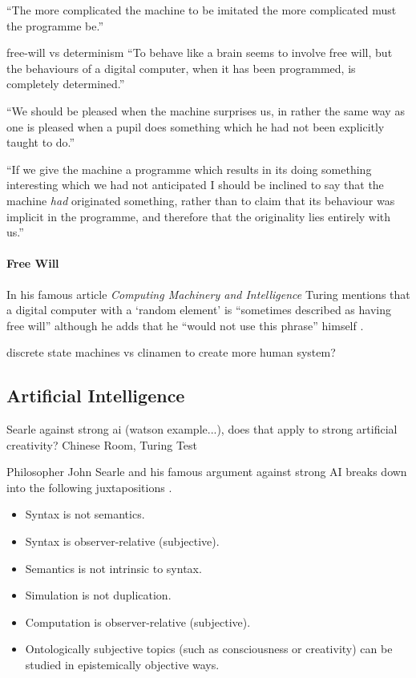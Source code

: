 \documentclass[11pt]{thesis} %
\begin{document}
``The more complicated the machine to be imitated the more complicated must the programme be.''\autocite{Turing1951} 




free-will vs determinism
``To behave like a brain seems to involve free will, but the behaviours of a digital computer, when it has been programmed, is completely determined.''\autocite{Turing1951} 

``We should be pleased when the machine surprises us, in rather the same way as one is pleased when a pupil does something which he had not been explicitly taught to do.''\autocite{Turing1951} 

``If we give the machine a programme which results in its doing something interesting which we had not anticipated I should be inclined to say that the machine \textit{had} originated something, rather than to claim that its behaviour was implicit in the programme, and therefore that the originality lies entirely with us.''\autocite{Turing1951} 





\paragraph{Free Will}

In his famous article \textit{Computing Machinery and Intelligence} Turing mentions that a digital computer with a `random element' is ``sometimes described as having free will'' although he adds that he ``would not use this phrase'' himself \autocite{Turing2009}. 




discrete state machines vs clinamen to create more human system?



\subsection{Artificial Intelligence}

Searle against strong ai (watson example...), does that apply to strong artificial creativity? Chinese Room, Turing Test

Philosopher John Searle and his famous argument against strong \ac{AI} breaks down into the following juxtapositions \autocite{Searle2015, Searle1990}.
 
\begin{itemize}
  \item Syntax is not semantics.
  \item Syntax is observer-relative (subjective).
  \item Semantics is not intrinsic to syntax.
  \item Simulation is not duplication.
  \item Computation is observer-relative (subjective).
  \item Ontologically subjective topics (such as consciousness or creativity) can be studied in epistemically objective ways.
\end{itemize}
\end{document}
